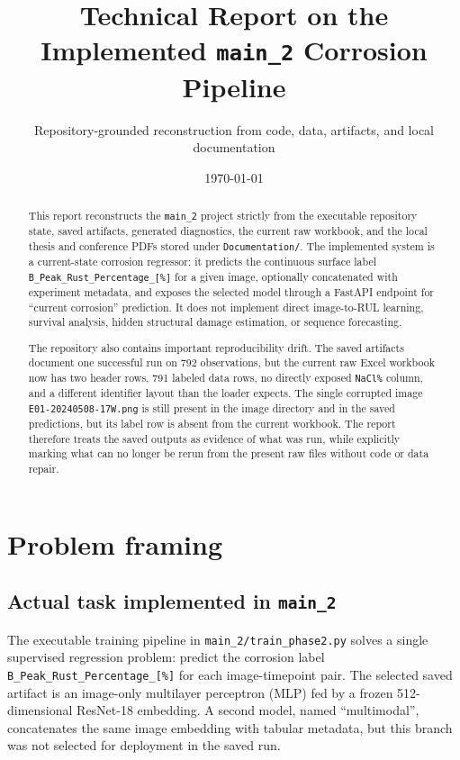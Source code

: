 \documentclass[11pt]{article}
\title{Technical Report on the Implemented \texttt{main\_2} Corrosion Pipeline}
\author{Repository-grounded reconstruction from code, data, artifacts, and local documentation}
\date{\today}
\begin{document}
\maketitle

\begin{abstract}
This report reconstructs the \texttt{main\_2} project strictly from the executable repository state, saved artifacts, generated diagnostics, the current raw workbook, and the local thesis and conference PDFs stored under \texttt{Documentation/}. The implemented system is a current-state corrosion regressor: it predicts the continuous surface label \texttt{B\_Peak\_Rust\_Percentage\_[\%]} for a given image, optionally concatenated with experiment metadata, and exposes the selected model through a FastAPI endpoint for ``current corrosion'' prediction. It does not implement direct image-to-RUL learning, survival analysis, hidden structural damage estimation, or sequence forecasting.

The repository also contains important reproducibility drift. The saved artifacts document one successful run on 792 observations, but the current raw Excel workbook now has two header rows, 791 labeled data rows, no directly exposed \texttt{NaCl\%} column, and a different identifier layout than the loader expects. The single corrupted image \texttt{E01-20240508-17W.png} is still present in the image directory and in the saved predictions, but its label row is absent from the current workbook. The report therefore treats the saved outputs as evidence of what was run, while explicitly marking what can no longer be rerun from the present raw files without code or data repair.
\end{abstract}

\tableofcontents
\clearpage

\section{Problem framing}

\subsection{Actual task implemented in \texttt{main\_2}}
The executable training pipeline in \texttt{main\_2/train\_phase2.py} solves a single supervised regression problem: predict the corrosion label \texttt{B\_Peak\_Rust\_Percentage\_[\%]} for each image-timepoint pair. The selected saved artifact is an image-only multilayer perceptron (MLP) fed by a frozen 512-dimensional ResNet-18 embedding. A second model, named ``multimodal'', concatenates the same image embedding with tabular metadata, but this branch was not selected for deployment in the saved run.
\end{document}
